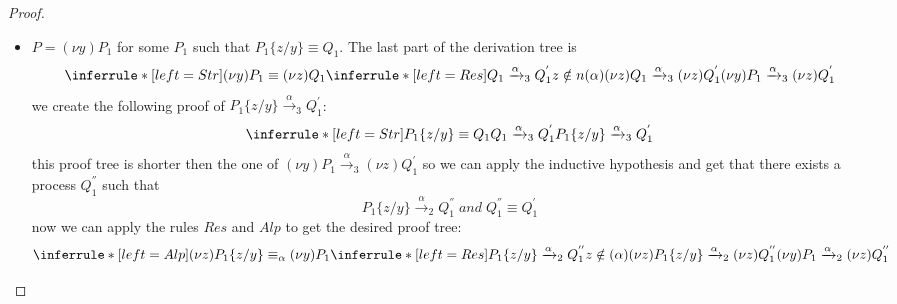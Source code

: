 \begin{theorem}
\begin{proof}
\begin{description}
\begin{description}
\begin{itemize}
\begin{description}
\begin{itemize}
\[{			    (\nu z)P_{1}\xrightarrow{\alpha}_{3}(\nu z)Q_{1}^{'}
			  }
			\]
			first we create the following proof:
			\[
			      \inferrule* [left=Str]{
				  P_{1}\equiv Q_{1}
				\\
				  Q_{1}
				    \xrightarrow{\alpha}_{3}
				      Q_{1}^{'}
			      }{
				P_{1}\xrightarrow{\alpha}_{3}Q_{1}^{'}
			      }
			\]
			now we can apply the inductive hypothesis and get $P_{1}\xrightarrow{\alpha}_{2}Q_{1}^{''}$ where $Q_{1}^{'}\equiv Q_{1}^{''}$. The last step is 
			\[
			  \inferrule* [left=Res]{
			      P_{1}\xrightarrow{\alpha}_{2}Q_{1}^{''}
			    \\
			      z\notin n(\alpha)
			  }{
			    (\nu z)P_{1}\xrightarrow{\alpha}_{2}(\nu z)Q_{1}^{''}
			  }
			\]
		      \item
			$P=(\nu y)P_{1}$ for some $P_{1}$ such that $P_{1}\{z/y\}\equiv Q_{1}$. The last part of the derivation tree is 
			\[
			  \inferrule* [left=Str]{
			      (\nu y)P_{1}\equiv (\nu z)Q_{1}
			    \\
			      \inferrule* [left=Res]{
				  Q_{1}\xrightarrow{\alpha}_{3}Q_{1}^{'}
				\\
				  z\notin n(\alpha)
			      }{
				(\nu z)Q_{1}\xrightarrow{\alpha}_{3}(\nu z)Q_{1}^{'}
			      }
			  }{
			    (\nu y)P_{1}\xrightarrow{\alpha}_{3}(\nu z)Q_{1}^{'}
			  }
			\]
			we create the following proof of $P_{1}\{z/y\}\xrightarrow{\alpha}_{3}Q_{1}^{'}$:
			\[
			  \inferrule* [left=Str]{
			      P_{1}\{z/y\}\equiv Q_{1}
			    \\
			      Q_{1}\xrightarrow{\alpha}_{3}Q_{1}^{'}
			  }{
			    P_{1}\{z/y\}\xrightarrow{\alpha}_{3}Q_{1}^{'}
			  }
			\]
			this proof tree is shorter then the one of $(\nu y)P_{1}\xrightarrow{\alpha}_{3}(\nu z)Q_{1}^{'}$ so we can apply the inductive hypothesis and get that there exists a process $Q_{1}^{''}$ such that 
			\[
			  P_{1}\{z/y\}\xrightarrow{\alpha}_{2}Q_{1}^{''}\; and\; Q_{1}^{''}\equiv Q_{1}^{'}
			\]
			now we can apply the rules $Res$ and $Alp$ to get the desired proof tree:
			\[
			  \inferrule* [left=Alp]{
				(\nu z)P_{1}\{z/y\}\equiv_{\alpha} (\nu y)P_{1}
			      \\
				\inferrule* [left=Res]{
				    P_{1}\{z/y\}
				      \xrightarrow{\alpha}_{2}
					Q_{1}^{''}
				  \\
				    z\notin(\alpha)
				  }{
				    (\nu z)P_{1}\{z/y\}
				      \xrightarrow{\alpha}_{2}
					(\nu z)Q_{1}^{''}
				  }
			  }{
			    (\nu y)P_{1}\xrightarrow{\alpha}_{2}(\nu z)Q_{1}^{''}
			  }
			\]
                      \end{itemize}

\end{description}
\end{itemize}
\end{description}
\end{description}
\end{proof}
\end{theorem}
